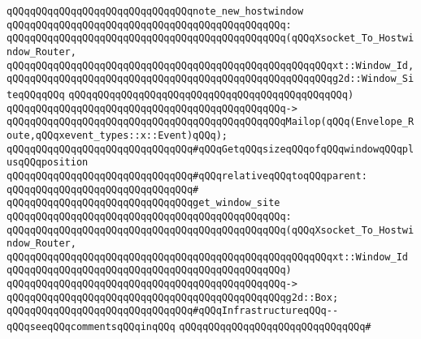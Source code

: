 \verb|qQQqqQQqqQQqqQQqqQQqqQQqqQQqqQQqnote_new_hostwindow|\newline
\verb|qQQqqQQqqQQqqQQqqQQqqQQqqQQqqQQqqQQqqQQqqQQqqQQq:|\newline
\verb|qQQqqQQqqQQqqQQqqQQqqQQqqQQqqQQqqQQqqQQqqQQqqQQq(qQQqXsocket_To_Hostwindow_Router,|\newline
\verb|qQQqqQQqqQQqqQQqqQQqqQQqqQQqqQQqqQQqqQQqqQQqqQQqqQQqqQQqxt::Window_Id,|\newline
\verb|qQQqqQQqqQQqqQQqqQQqqQQqqQQqqQQqqQQqqQQqqQQqqQQqqQQqqQQqg2d::Window_SiteqQQqqQQq|\newline
\verb|qQQqqQQqqQQqqQQqqQQqqQQqqQQqqQQqqQQqqQQqqQQqqQQq)|\newline
\verb|qQQqqQQqqQQqqQQqqQQqqQQqqQQqqQQqqQQqqQQqqQQqqQQq->|\newline
\verb|qQQqqQQqqQQqqQQqqQQqqQQqqQQqqQQqqQQqqQQqqQQqqQQqMailop(qQQq(Envelope_Route,qQQqxevent_types::x::Event)qQQq);|\newline
\newline
\verb|qQQqqQQqqQQqqQQqqQQqqQQqqQQqqQQq#qQQqGetqQQqsizeqQQqofqQQqwindowqQQqplusqQQqposition|\newline
\verb|qQQqqQQqqQQqqQQqqQQqqQQqqQQqqQQq#qQQqrelativeqQQqtoqQQqparent:|\newline
\verb|qQQqqQQqqQQqqQQqqQQqqQQqqQQqqQQq#|\newline
\verb|qQQqqQQqqQQqqQQqqQQqqQQqqQQqqQQqget_window_site|\newline
\verb|qQQqqQQqqQQqqQQqqQQqqQQqqQQqqQQqqQQqqQQqqQQqqQQq:|\newline
\verb|qQQqqQQqqQQqqQQqqQQqqQQqqQQqqQQqqQQqqQQqqQQqqQQq(qQQqXsocket_To_Hostwindow_Router,|\newline
\verb|qQQqqQQqqQQqqQQqqQQqqQQqqQQqqQQqqQQqqQQqqQQqqQQqqQQqqQQqxt::Window_Id|\newline
\verb|qQQqqQQqqQQqqQQqqQQqqQQqqQQqqQQqqQQqqQQqqQQqqQQq)|\newline
\verb|qQQqqQQqqQQqqQQqqQQqqQQqqQQqqQQqqQQqqQQqqQQqqQQq->|\newline
\verb|qQQqqQQqqQQqqQQqqQQqqQQqqQQqqQQqqQQqqQQqqQQqqQQqg2d::Box;|\newline
\newline
\newline
\verb|qQQqqQQqqQQqqQQqqQQqqQQqqQQqqQQq#qQQqInfrastructureqQQq--qQQqseeqQQqcommentsqQQqinqQQq|\newline
\verb|qQQqqQQqqQQqqQQqqQQqqQQqqQQqqQQq#|\newline
